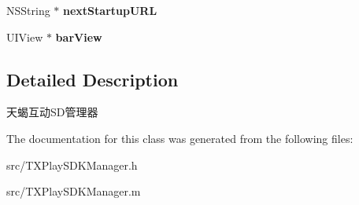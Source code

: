 \begin{DoxyCompactItemize}
\item 
\hypertarget{interface_t_x_play_s_d_k_manager_ae8508a69936ffc2b0b763e054b83910d}{}N\+S\+String $\ast$ {\bfseries next\+Startup\+U\+R\+L}\label{interface_t_x_play_s_d_k_manager_ae8508a69936ffc2b0b763e054b83910d}

\item 
\hypertarget{interface_t_x_play_s_d_k_manager_a2f45414f3fc0bca58534af340743354e}{}U\+I\+View $\ast$ {\bfseries bar\+View}\label{interface_t_x_play_s_d_k_manager_a2f45414f3fc0bca58534af340743354e}

\end{DoxyCompactItemize}


\subsection{Detailed Description}
天蝎互动\+S\+D管理器 

The documentation for this class was generated from the following files\+:\begin{DoxyCompactItemize}
\item 
src/T\+X\+Play\+S\+D\+K\+Manager.\+h\item 
src/T\+X\+Play\+S\+D\+K\+Manager.\+m\end{DoxyCompactItemize}
